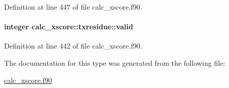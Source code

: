 Definition at line 447 of file calc\-\_\-xscore.\-f90.

\hypertarget{structcalc__xscore_1_1txresidue_aaf75d81d84cd19e15eaa89ea686e52db}{
\paragraph[{valid}]{\setlength{\rightskip}{0pt plus 5cm}integer calc\-\_\-xscore\-::txresidue\-::valid}}\label{structcalc__xscore_1_1txresidue_aaf75d81d84cd19e15eaa89ea686e52db}


Definition at line 442 of file calc\-\_\-xscore.\-f90.



The documentation for this type was generated from the following file\-:\begin{DoxyCompactItemize}
\item 
\hyperlink{calc__xscore_8f90}{calc\-\_\-xscore.\-f90}\end{DoxyCompactItemize}
